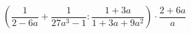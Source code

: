 \begin{ex}[type=expression]
	\begin{condition}
		\( \left( \dfrac{1}{2-6a}+\dfrac{1}{27a^3-1}:\dfrac{1+3a}{1+3a+9a^2} \right)\cdot\dfrac{2+6a}{a} \)
	\end{condition}
\end{ex}